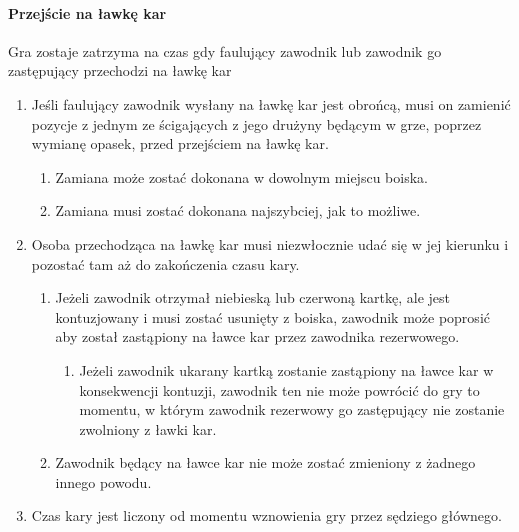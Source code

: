 \documentclass[12pt]{article}
\begin{document}
\paragraph{Przejście na ławkę kar}
Gra zostaje zatrzyma na czas
gdy faulujący zawodnik lub zawodnik go zastępujący przechodzi na ławkę
kar

\begin{enumerate}
	\item
	      Jeśli faulujący zawodnik wysłany na ławkę kar jest obrońcą, musi on
	      zamienić pozycje z jednym ze ścigających z jego drużyny będącym w
	      grze, poprzez wymianę opasek, przed przejściem na ławkę kar.

	      \begin{enumerate}
		      \item
		            Zamiana może zostać dokonana w dowolnym miejscu boiska.
		      \item
		            Zamiana musi zostać dokonana najszybciej, jak to możliwe.
	      \end{enumerate}
	\item
	      Osoba przechodząca na ławkę kar musi niezwłocznie udać się w jej
	      kierunku i pozostać tam aż do zakończenia czasu kary.

	      \begin{enumerate}
		      \item
		            Jeżeli zawodnik otrzymał niebieską lub czerwoną kartkę, ale jest
		            kontuzjowany i musi zostać usunięty z boiska, zawodnik może poprosić
		            aby został zastąpiony na ławce kar przez zawodnika rezerwowego.

		            \begin{enumerate}
			            \item
			                  Jeżeli zawodnik ukarany kartką zostanie zastąpiony na ławce kar w
			                  konsekwencji kontuzji, zawodnik ten nie może powrócić do gry to
			                  momentu, w którym zawodnik rezerwowy go zastępujący nie zostanie
			                  zwolniony z ławki kar.
		            \end{enumerate}
		      \item
		            Zawodnik będący na ławce kar nie może zostać zmieniony z żadnego
		            innego powodu.
	      \end{enumerate}
	\item
	      Czas kary jest liczony od momentu wznowienia gry przez sędziego
	      głównego.
\end{enumerate}
\end{document}
